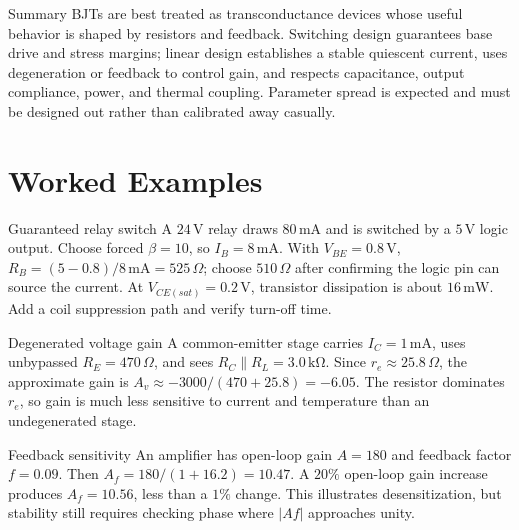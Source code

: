 \documentclass[10pt,letterpaper]{article}
\begin{document}
\begin{CornellSummaryBox}{Summary}
BJTs are best treated as transconductance devices whose useful behavior is shaped by resistors and feedback. Switching design guarantees base drive and stress margins; linear design establishes a stable quiescent current, uses degeneration or feedback to control gain, and respects capacitance, output compliance, power, and thermal coupling. Parameter spread is expected and must be designed out rather than calibrated away casually.
\end{CornellSummaryBox}
\section{Worked Examples}
\begin{CornellExamBox}{Guaranteed relay switch}
A $24\,\mathrm{V}$ relay draws $80\,\mathrm{mA}$ and is switched by a $5\,\mathrm{V}$ logic output. Choose forced $\beta=10$, so $I_B=8\,\mathrm{mA}$. With $V_{BE}=0.8\,\mathrm{V}$, $R_B=(5-0.8)/8\,\mathrm{mA}=525\,\Omega$; choose $510\,\Omega$ after confirming the logic pin can source the current. At $V_{CE(sat)}=0.2\,\mathrm{V}$, transistor dissipation is about $16\,\mathrm{mW}$. Add a coil suppression path and verify turn-off time.
\end{CornellExamBox}
\begin{CornellExamBox}{Degenerated voltage gain}
A common-emitter stage carries $I_C=1\,\mathrm{mA}$, uses unbypassed $R_E=470\,\Omega$, and sees $R_C\parallel R_L=3.0\,\mathrm{k\Omega}$. Since $r_e\approx25.8\,\Omega$, the approximate gain is $A_v\approx-3000/(470+25.8)=-6.05$. The resistor dominates $r_e$, so gain is much less sensitive to current and temperature than an undegenerated stage.
\end{CornellExamBox}
\begin{CornellExamBox}{Feedback sensitivity}
An amplifier has open-loop gain $A=180$ and feedback factor $f=0.09$. Then $A_f=180/(1+16.2)=10.47$. A $20\%$ open-loop gain increase produces $A_f=10.56$, less than a $1\%$ change. This illustrates desensitization, but stability still requires checking phase where $|Af|$ approaches unity.
\end{CornellExamBox}
\end{document}
